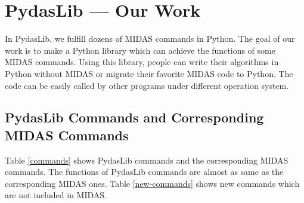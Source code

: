           \section{PydasLib --- Our Work}
In PydasLib, we fulfill dozens of MIDAS commands in Python. The goal of our work is to make a Python library which can achieve the functions of some MIDAS commands. Using this library, people can write their algorithms in Python without MIDAS or migrate their favorite MIDAS code to Python. The code can be easily called by other programs under different operation system. 

	  \subsection{PydasLib Commands and Corresponding MIDAS Commands}
Table \ref{commands} shows PydasLib commands and the corresponding MIDAS commands. The functions of PydasLib commands are almost as same as the corresponding MIDAS ones. Table \ref{new-commands} shows new commands which are not included in MIDAS. 

